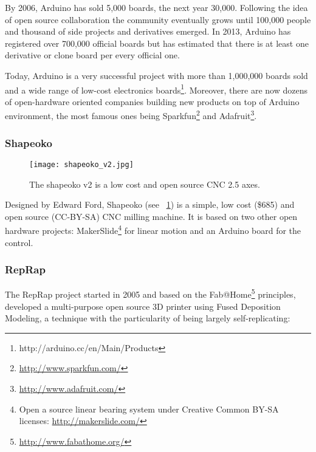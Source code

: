 By 2006, Arduino has sold 5,000 boards, the next year 30,000. Following the idea of open source collaboration the community eventually grows until 100,000 people and thousand of side projects and derivatives emerged. In 2013, Arduino has registered over 700,000 official boards but has estimated that there is at least one derivative or clone board per every official one.

Today, Arduino is a very successful project with more than 1,000,000 boards sold and a wide range of low-cost electronics boards\footnote{http://arduino.cc/en/Main/Products}. Moreover, there are now dozens of open-hardware oriented companies building new products on top of Arduino environment, the most famous ones being Sparkfun\footnote{\url{http://www.sparkfun.com/}} and Adafruit\footnote{\url{http://www.adafruit.com/}}.

\subsubsection{Shapeoko}

\begin{figure}[!ht]
    \begin{center}
        \texttt{[image: shapeoko\_v2.jpg]}
    \end{center}
    \caption{The shapeoko v2 is a low cost and open source CNC 2.5 axes.}
    \label{fig:shapeoko}
\end{figure}

Designed by Edward Ford, Shapeoko (see \figurename~\ref{fig:shapeoko}) is a simple, low cost (\$685) and open source (CC-BY-SA) CNC milling machine. It is based on two other open hardware projects: MakerSlide\footnote{Open a source linear bearing system under Creative Common BY-SA licenses: \url{http://makerslide.com/}} for linear motion and an Arduino board for the control.



\subsubsection{RepRap} %

The RepRap project started in 2005 and based on the Fab@Home\footnote{\url{http://www.fabathome.org/}} principles, developed a multi-purpose open source 3D printer using Fused Deposition Modeling, a technique with the particularity of being largely self-replicating:

